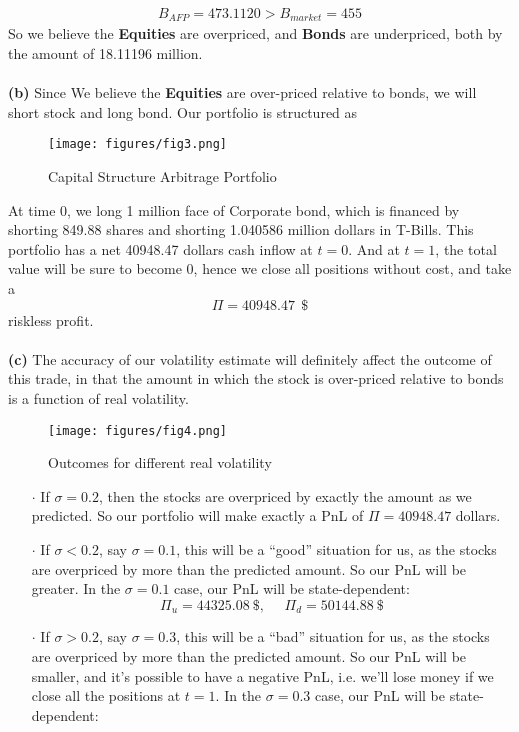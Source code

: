 \documentclass[10 pt]{hwtemplate} %
\begin{document}
\begin{solution}
\begin{equation}
\begin{split}
		B_{AFP} = 473.1120 > B_{market} = 455
	\end{split}
\end{equation}
So we believe the \textbf{Equities} are overpriced, and \textbf{Bonds} are underpriced, both by the amount of 18.11196 million.\\
~\\
\textbf{(b)} Since We believe the \textbf{Equities} are over-priced relative to bonds, we will short stock and long bond. Our portfolio is structured as
\begin{figure}[H]
  \centering
  \captionsetup{justification=centering}
  \caption{Capital Structure Arbitrage Portfolio}
  \texttt{[image: figures/fig3.png]}
\end{figure}
At time 0, we long 1 million face of Corporate bond, which is financed by shorting 849.88 shares and shorting 1.040586 million dollars in T-Bills. This portfolio has a net 40948.47 dollars cash inflow at $t=0$. And at $t=1$, the total value will be sure to become 0, hence we close all positions without cost, and take a 
$$
\Pi = 40948.47 ~~\$
$$
riskless profit.\\
~\\
\textbf{(c)} The accuracy of our volatility estimate will definitely affect the outcome of this trade, in that the amount in which the stock is over-priced relative to bonds is a function of real volatility. 
\begin{figure}[H]
  \centering
  \captionsetup{justification=centering}
  \caption{Outcomes for different real volatility}
  \texttt{[image: figures/fig4.png]}
\end{figure}
\begin{itemize}
	\item[$\cdot$] If $\sigma = 0.2$, then the stocks are overpriced by exactly the amount as we predicted. So our portfolio will make exactly a PnL of $\Pi = 40948.47$ dollars.
	\item[$\cdot$] If $\sigma < 0.2$, say $\sigma=0.1$, this will be a ``good'' situation for us, as the stocks are overpriced by more than the predicted amount. So our PnL will be greater. In the $\sigma=0.1$ case, our PnL will be state-dependent:
	$$
	\Pi_u = 44325.08~\$,~~~~~~\Pi_d = 50144.88~\$
	$$
	\item[$\cdot$] If $\sigma > 0.2$, say $\sigma=0.3$, this will be a ``bad'' situation for us, as the stocks are overpriced by more than the predicted amount. So our PnL will be smaller, and it's possible to have a negative PnL, i.e. we'll lose money if we close all the positions at $t=1$. In the $\sigma=0.3$ case, our PnL will be state-dependent:

\end{itemize}
\end{solution}
\end{document}
